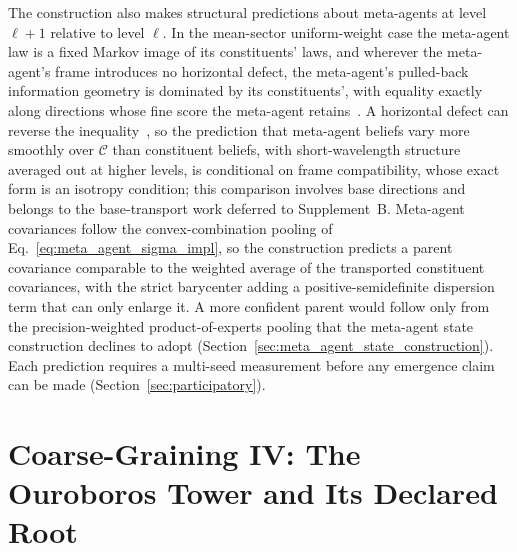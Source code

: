 \documentclass[11pt]{article}
\begin{document}
The construction also makes structural predictions about meta-agents at level $\ell+1$ relative to level $\ell$. In the mean-sector uniform-weight case the meta-agent law is a fixed Markov image of its constituents' laws, and wherever the meta-agent's frame introduces no horizontal defect, the meta-agent's pulled-back information geometry is dominated by its constituents', with equality exactly along directions whose fine score the meta-agent retains~\cite[Ch.~B2, the coarse or meta-agent perceived-geometry corollary]{DennisGaugeVFESuppB2026}. A horizontal defect can reverse the inequality~\cite[Ch.~B2, the exact signed positivity criterion]{DennisGaugeVFESuppB2026}, so the prediction that meta-agent beliefs vary more smoothly over $\mathcal{C}$ than constituent beliefs, with short-wavelength structure averaged out at higher levels, is conditional on frame compatibility, whose exact form is an isotropy condition; this comparison involves base directions and belongs to the base-transport work deferred to Supplement~B. Meta-agent covariances follow the convex-combination pooling of Eq.~\eqref{eq:meta_agent_sigma_impl}, so the construction predicts a parent covariance comparable to the weighted average of the transported constituent covariances, with the strict barycenter adding a positive-semidefinite dispersion term that can only enlarge it. A more confident parent would follow only from the precision-weighted product-of-experts pooling that the meta-agent state construction declines to adopt (Section~\ref{sec:meta_agent_state_construction}). Each prediction requires a multi-seed measurement before any emergence claim can be made (Section~\ref{sec:participatory}).

\section{Coarse-Graining IV: The Ouroboros Tower and Its Declared Root}\label{sec:ouroboros}
\end{document}
